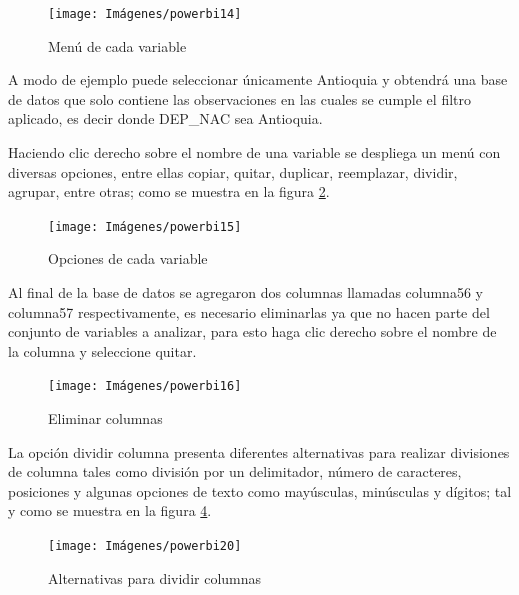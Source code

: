 \documentclass[
]{book}
\begin{document}
\begin{figure}

{\centering \texttt{[image: Imágenes/powerbi14]} 

}

\caption{Menú de cada variable}\label{fig:opcionesfiltrado-fig}
\end{figure}

A modo de ejemplo puede seleccionar únicamente Antioquia y obtendrá una base de datos que solo contiene las observaciones en las cuales se cumple el filtro aplicado, es decir donde DEP\_NAC sea Antioquia.

Haciendo clic derecho sobre el nombre de una variable se despliega un menú con diversas opciones, entre ellas copiar, quitar, duplicar, reemplazar, dividir, agrupar, entre otras; como se muestra en la figura \ref{fig:opcionesdecolumna-fig}.

\begin{figure}

{\centering \texttt{[image: Imágenes/powerbi15]} 

}

\caption{Opciones de cada variable}\label{fig:opcionesdecolumna-fig}
\end{figure}

Al final de la base de datos se agregaron dos columnas llamadas columna56 y columna57 respectivamente, es necesario eliminarlas ya que no hacen parte del conjunto de variables a analizar, para esto haga clic derecho sobre el nombre de la columna y seleccione quitar.

\begin{figure}

{\centering \texttt{[image: Imágenes/powerbi16]} 

}

\caption{Eliminar columnas}\label{fig:quitarcolumnas-fig}
\end{figure}

La opción dividir columna presenta diferentes alternativas para realizar divisiones de columna tales como división por un delimitador, número de caracteres, posiciones y algunas opciones de texto como mayúsculas, minúsculas y dígitos; tal y como se muestra en la figura \ref{fig:opcionesdedivision-fig}.

\begin{figure}

{\centering \texttt{[image: Imágenes/powerbi20]} 

}

\caption{Alternativas para dividir columnas}\label{fig:opcionesdedivision-fig}
\end{figure}
\end{document}
